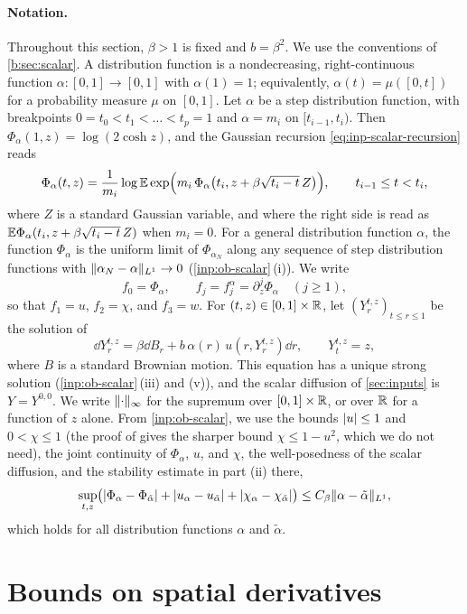 \paragraph{Notation.} Throughout this section, $\beta>1$ is fixed and
$b=\beta^2$. We use the conventions of \cref{b:sec:scalar}. A distribution
function is a nondecreasing, right-continuous function
$\alpha\colon[0,1]\to[0,1]$ with $\alpha(1)=1$; equivalently,
$\alpha(t)=\mu([0,t])$ for a probability measure $\mu$ on $[0,1]$. Let
$\alpha$ be a step distribution function, with breakpoints
$0=t_0<t_1<\dots<t_p=1$ and $\alpha=m_i$ on $[t_{i-1},t_i)$. Then
$\Phi_\alpha(1,z)=\log(2\cosh z)$, and the Gaussian recursion
\eqref{eq:inp-scalar-recursion} reads
\begin{equation}\label{eq:sc-recursion}
 \Phi_\alpha(t,z)=\frac1{m_i}\log\mathbb E\exp\Bigl(m_i\,
   \Phi_\alpha\bigl(t_i,z+\beta\sqrt{t_i-t}\,Z\bigr)\Bigr),
 \qquad t_{i-1}\le t<t_i,
\end{equation}
where $Z$ is a standard Gaussian variable, and where the right side is read
as $\mathbb E\Phi_\alpha(t_i,z+\beta\sqrt{t_i-t}\,Z)$ when $m_i=0$. For a
general distribution function $\alpha$, the function $\Phi_\alpha$ is the
uniform limit of $\Phi_{\alpha_N}$ along any sequence of step distribution
functions with $\lVert \alpha_N-\alpha\rVert_{L^1}\to0$ (\cref{inp:ob-scalar}\,(i)). We
write
\[
 f_0=\Phi_\alpha,\qquad f_j=f_j^\alpha=\partial_z^j\Phi_\alpha\quad(j\ge1),
\]
so that $f_1=u$, $f_2=\chi$, and $f_3=w$. For $(t,z)\in[0,1]\times\mathbb R$, let
$(Y^{t,z}_r)_{t\le r\le1}$ be the solution of
\[
 \dd Y^{t,z}_r=\beta\dd B_r+b\,\alpha(r)\,u(r,Y^{t,z}_r)\dd r,\qquad
 Y^{t,z}_t=z,
\]
where $B$ is a standard Brownian motion. This equation has a unique strong
solution (\cref{inp:ob-scalar}\,(iii) and (v)), and the scalar diffusion of
\cref{sec:inputs} is $Y=Y^{0,0}$. We write $\lVert \cdot\rVert_\infty$ for the
supremum over $[0,1]\times\mathbb R$, or over $\mathbb R$ for a function of $z$ alone.
From \cref{inp:ob-scalar}, we use the bounds $\lvert u\rvert\le1$ and $0<\chi\le1$
(the proof of \cite[Lemma~3.1]{oai-barriers} gives the sharper bound
$\chi\le1-u^2$, which we do not need), the joint continuity of $\Phi_\alpha$,
$u$, and $\chi$, the well-posedness of the scalar diffusion, and the
stability estimate in part (ii) there,
\[
 \sup_{t,z}\bigl(\lvert \Phi_\alpha-\Phi_{\tilde\alpha}\rvert
   +\lvert u_\alpha-u_{\tilde\alpha}\rvert+\lvert \chi_\alpha-\chi_{\tilde\alpha}\rvert\bigr)
 \le C_\beta\lVert \alpha-\tilde\alpha\rVert_{L^1},
\]
which holds for all distribution functions $\alpha$ and $\tilde\alpha$.

\section{Bounds on spatial derivatives}\label{sec:sc-derivatives}

